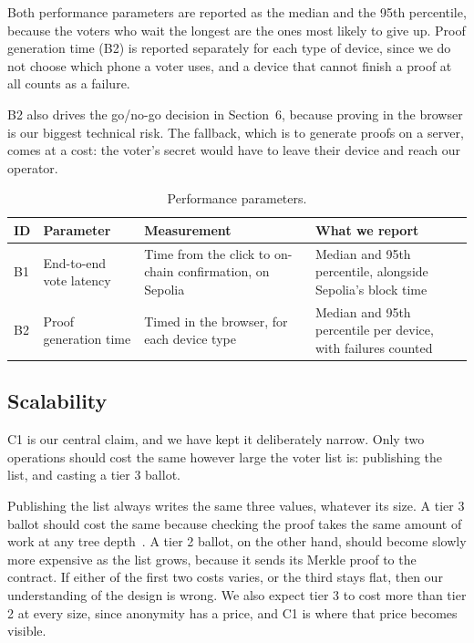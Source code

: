 Both performance parameters are reported as the median and the 95th percentile,
because the voters who wait the longest are the ones most likely to give up.
Proof generation time (B2) is reported separately for each type of device,
since we do not choose which phone a voter uses, and a device that cannot
finish a proof at all counts as a failure.

B2 also drives the go/no-go decision in Section~6, because proving in the
browser is our biggest technical risk. The fallback, which is to generate
proofs on a server, comes at a cost: the voter's secret would have to leave
their device and reach our operator.

\begin{table}[htbp]
  \centering
  \caption{Performance parameters.}
  \label{tab:eval-perf}
  \small
  \begin{tabular}{@{}lL{4.3cm}L{5.0cm}L{5.0cm}@{}}
    \toprule
    \textbf{ID} & \textbf{Parameter}           & \textbf{Measurement}                   & \textbf{What we report} \\
    \midrule
    B1          & End-to-end vote latency      & Time from the click to on-chain confirmation, on Sepolia & Median and 95th percentile, alongside Sepolia's block time \\
    B2          & Proof generation time        & Timed in the browser, for each device type  & Median and 95th percentile per device, with failures counted \\
    \bottomrule
  \end{tabular}
\end{table}

\subsection{Scalability}

C1 is our central claim, and we have kept it deliberately narrow. Only two
operations should cost the same however large the voter list is: publishing
the list, and casting a tier 3 ballot.

Publishing the list always writes the same three values, whatever its size. A
tier 3 ballot should cost the same because checking the proof takes the same
amount of work at any tree depth~\cite{groth16}. A tier 2 ballot, on the other
hand, should become slowly more expensive as the list grows, because it sends
its Merkle proof to the contract. If either of the first two costs varies, or
the third stays flat, then our understanding of the design is wrong. We also
expect tier 3 to cost more than tier 2 at every size, since anonymity has a
price, and C1 is where that price becomes visible.

